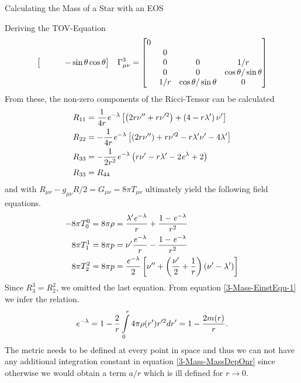 \begin{section}{Calculating the Mass of a Star with an EOS}
\begin{subsection}{Deriving the TOV-Equation}
\begin{align}
\begin{bmatrix}
	                     	& & & -\sin\theta\cos\theta
	                     \end{bmatrix}\hspace{0.3cm}
	\Gamma_{\mu\nu}^3 = \begin{bmatrix}
	                     	0 & & &\\
	                     	& 0 & &\\
	                     	& 0 & 0 & 1/r\\
	                     	& 0 & 0 & \cos\theta/\sin\theta\\
	                     	& 1/r & \cos\theta/\sin\theta & 0
						\end{bmatrix}
\end{align}
From these, the non-zero components of the Ricci-Tensor can be calculated 
\begin{align}
	R_{11} &= \frac{1}{4r}\mathit{e}^{-\lambda}\left[\left(2r\nu''+r\nu'^2\right) + \left(4-r\lambda'\right)\nu'\right]\\
	R_{22} &= -\frac{1}{4r}\mathit{e}^{-\lambda}\left[\left(2r\nu''\right)+r\nu'^2-r\lambda'\nu'-4\lambda'\right]\\
	R_{33} &= -\frac{1}{2r^2}\mathit{e}^{-\lambda}\left(r\nu'-r\lambda'-2\mathit{e}^\lambda+2\right)\\
	R_{33} &= R_{44}
\end{align}
and with $R_{\mu\nu}-g_{\mu\nu}R/2=G_{\mu\nu}=8\pi T_{\mu\nu}$ ultimately yield the following field equations.
\begin{align}
	-8\pi T_0^0 = 8\pi\rho &= \frac{\lambda'\mathit{e}^{-\lambda}}{r}+\frac{1-\mathit{e}^{-\lambda}}{r^2}\label{3-Mass-EinstEqu-1}\\
	8\pi T_1^1 = 8\pi p &= \nu'\frac{\mathit{e}^{-\lambda}}{r} - \frac{1-\mathit{e}^{-\lambda}}{r^2}\label{3-Mass-EinstEqu-2}\\
	8\pi T_2^2 = 8\pi p &= \frac{\mathit{e}^{-\lambda}}{2}\left[\nu''+\left(\frac{\nu'}{2} + \frac{1}{r}\right)\left(\nu'-\lambda'\right) \right]\label{3-Mass-EinstEqu-3}
\end{align}
Since $R_3^3=R_2^2$, we omitted the last equation. From equation \eqref{3-Mass-EinstEqu-1} we infer the relation.
\begin{equation}
	\mathit{e}^{-\lambda} = 1 - \frac{2}{r}\int\limits_0^r 4\pi\rho(r') r'^2dr' = 1 - \frac{2m(r)}{r}.
	\label{3-Mass-MassDepOnr}
\end{equation}
The metric needs to be defined at every point in space and thus we can not have any additional integration constant in equation \eqref{3-Mass-MassDepOnr} since otherwise we would obtain a term $a/r$ which is ill defined for $r\rightarrow0$.\\

\end{subsection}
\end{section}
